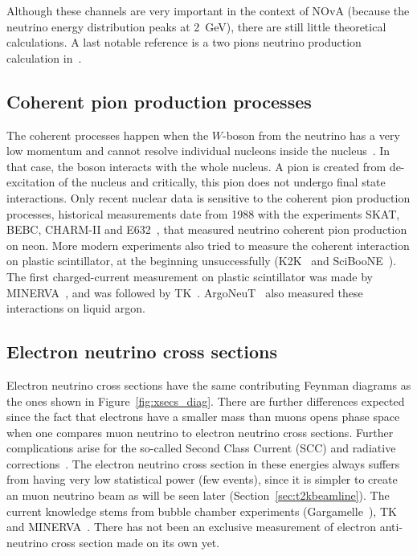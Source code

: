 Although these channels are very important in the context of
\Gls{NOvA} (because the neutrino energy distribution peaks at 2~GeV),
there are still little theoretical calculations. A last notable
reference is a two pions neutrino production calculation
in~\cite{Hernandez:2007ej}.

\subsection{Coherent pion production processes}
The coherent processes happen when the $W$-boson from the neutrino has
a very low momentum and cannot resolve individual nucleons inside the
nucleus~\cite{Rein:2006di,Berger:2008xs}. In that case, the boson
interacts with the whole nucleus. A pion is created from de-excitation
of the nucleus and critically, this pion does not undergo final state
interactions. Only recent nuclear data is sensitive to the coherent
pion production processes, historical measurements date from 1988 with
the experiments SKAT, BEBC, CHARM-II and
E632~\cite{Grabosch:1985mt,Allport:1988cq,Vilain:1993sf,Aderholz:1988cs},
that measured neutrino coherent pion production on neon. More modern
experiments also tried to measure the coherent interaction on plastic
scintillator, at the beginning unsuccessfully
(\Gls{K2K}~\cite{Hasegawa:2005td} and
\Gls{SciBooNE}~\cite{PhysRevD.78.112004}). The first charged-current
measurement on plastic scintillator was made by
\Gls{MINERVA}~\cite{Higuera:2014azj}, and was followed by
\Gls{TK}~\cite{Abe:2016fic}. \Gls{ArgoNeuT}~\cite{Acciarri:2014eit}
also measured these interactions on liquid argon.

\subsection{Electron neutrino cross sections}
\label{subsec:electronnu}
Electron neutrino cross sections have the same contributing Feynman
diagrams as the ones shown in Figure~\ref{fig:xsecs_diag}. There are
further differences expected since the fact that electrons have a
smaller mass than muons opens phase space when one compares muon
neutrino to electron neutrino cross sections. Further complications
arise for the so-called Second Class Current (\Gls{SCC}) and radiative
corrections~\cite{Day:2012gb}. The electron neutrino cross section in
these energies always suffers from having very low statistical power
(few events), since it is simpler to create an muon neutrino beam as
will be seen later (Section~\ref{sec:t2kbeamline}). The current
knowledge stems from bubble chamber experiments
(Gargamelle~\cite{Blietschau:1977mu}), \Gls{TK}~\cite{nueT2K} and
\Gls{MINERVA}~\cite{Wolcott:2015hda}. There has not been an exclusive
measurement of electron anti-neutrino cross section made on its own
yet.

